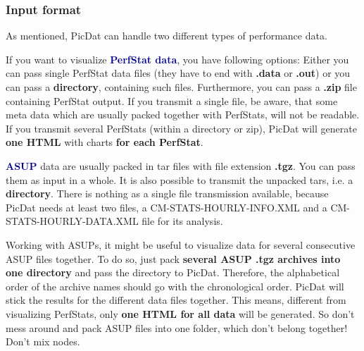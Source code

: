 \documentclass[8pt]{beamer}
\begin{document}
\begin{frame}
\frametitle{Input format}
As mentioned, PicDat can handle two different types of performance data.
\bigskip

If you want to visualize \textcolor{darkblue}{\textbf{PerfStat data}}, you have following options: Either you can pass single PerfStat data files (they have to end with \textbf{.data} or \textbf{.out}) or you can pass a \textbf{directory}, containing such files. Furthermore, you can pass a \textbf{.zip} file containing PerfStat output. If you transmit a single file, be aware, that some meta data which are usually packed together with PerfStats, will not be readable. If you transmit several PerfStats (within a directory or zip), PicDat will generate \textbf{one HTML} with charts \textbf{for each PerfStat}. 
\bigskip

\textcolor{darkblue}{\textbf{ASUP}} data are usually packed in tar files with file extension \textbf{.tgz}. You can pass them as input in a whole. It is also possible to transmit the unpacked tars, i.e. a \textbf{directory}. There is nothing as a single file transmission available, because PicDat needs at least two files, a CM-STATS-HOURLY-INFO.XML and a CM-STATS-HOURLY-DATA.XML file for its analysis. 

Working with ASUPs, it might be useful to visualize data for several consecutive ASUP files together. To do so, just pack \textbf{several ASUP .tgz archives into one directory} and pass the directory to PicDat. Therefore, the alphabetical order of the archive names should go with the chronological order. PicDat will stick the results for the different data files together. This means, different from visualizing PerfStats, only \textbf{one HTML for all data} will be generated. So don't mess around and pack ASUP files into one folder, which don't belong together! Don't mix nodes.
\end{frame}
\end{document}
